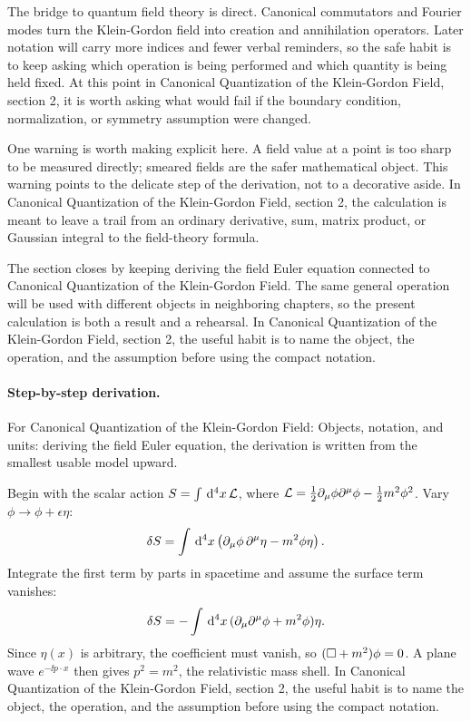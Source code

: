 The bridge to quantum field theory is direct.  Canonical commutators and Fourier modes turn the Klein-Gordon field into creation and annihilation operators.  Later notation will carry more indices and fewer verbal reminders, so the safe habit is to keep asking which operation is being performed and which quantity is being held fixed.  At this point in Canonical Quantization of the Klein-Gordon Field, section 2, it is worth asking what would fail if the boundary condition, normalization, or symmetry assumption were changed.

One warning is worth making explicit here.  A field value at a point is too sharp to be measured directly; smeared fields are the safer mathematical object.  This warning points to the delicate step of the derivation, not to a decorative aside.  In Canonical Quantization of the Klein-Gordon Field, section 2, the calculation is meant to leave a trail from an ordinary derivative, sum, matrix product, or Gaussian integral to the field-theory formula.

The section closes by keeping deriving the field Euler equation connected to Canonical Quantization of the Klein-Gordon Field.  The same general operation will be used with different objects in neighboring chapters, so the present calculation is both a result and a rehearsal.  In Canonical Quantization of the Klein-Gordon Field, section 2, the useful habit is to name the object, the operation, and the assumption before using the compact notation.



\paragraph{Step-by-step derivation.}

For Canonical Quantization of the Klein-Gordon Field: Objects, notation, and units: deriving the field Euler equation, the derivation is written from the smallest usable model upward.

Begin with the scalar action \(S=\int\,\mathrm d^4x\,\mathcal L\), where \(\mathcal L=\frac12\partial_\mu\phi\partial^\mu\phi-\frac12m^2\phi^2\).  Vary \(\phi\to\phi+\epsilon\eta\):
\[
  \delta S=\int\,\mathrm d^4x\left(\partial_\mu\phi\,\partial^\mu\eta-m^2\phi\eta\right).
\]
Integrate the first term by parts in spacetime and assume the surface term vanishes:
\[
  \delta S=-\int\,\mathrm d^4x\,(\partial_\mu\partial^\mu\phi+m^2\phi)\eta.
\]
Since \(\eta(x)\) is arbitrary, the coefficient must vanish, so \((\Box+m^2)\phi=0\).  A plane wave \(e^{-\ii p\cdot x}\) then gives \(p^2=m^2\), the relativistic mass shell.  In Canonical Quantization of the Klein-Gordon Field, section 2, the useful habit is to name the object, the operation, and the assumption before using the compact notation.


